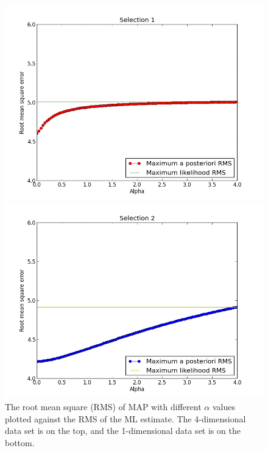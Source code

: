 \documentclass[11pt,a4paper]{article}
\begin{document}
\begin{figure}[htbp]
    \centering
    \begin{minipage}[b]{.65\linewidth}
        \centering
        \includegraphics[width=\textwidth]{images/prob12-sel1.png}
    \end{minipage}

    \begin{minipage}[b]{.65\linewidth}
        \centering
        \includegraphics[width=\textwidth]{images/prob12-sel2.png}
    \end{minipage}
    \caption{The root mean square (RMS) of MAP with different $\alpha$ values
        plotted against the RMS of the ML estimate. The 4-dimensional data set
    is on the top, and the 1-dimensional data set is on the bottom.}
    \label{fig:RMS}
\end{figure}
\end{document}
